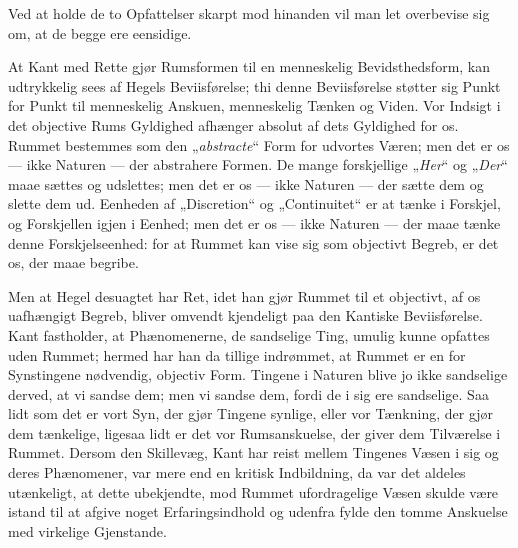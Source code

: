\documentclass[12pt,a4paper]{book}
\begin{document}
Ved at holde de to Opfattelser skarpt mod hinanden vil man let
overbevise sig om, at de begge ere eensidige.

At Kant med Rette gjør Rumsformen til en menneskelig
Bevidsthedsform, kan udtrykkelig sees af Hegels Beviisførelse; thi
denne Beviisførelse støtter sig Punkt for Punkt til menneskelig
Anskuen, menneskelig Tænken og Viden. Vor Indsigt i det objective Rums
Gyldighed afhænger absolut af dets Gyldighed for os. Rummet bestemmes
som den „\emph{abstracte}“ Form for udvortes Væren; men det er os ---
ikke Naturen --- der abstrahere Formen. De mange forskjellige
„\emph{Her}“ og „\emph{Der}“ maae sættes og udslettes; men det er os
--- ikke Naturen --- der sætte dem og slette dem ud. Eenheden af
„Discretion“ og „Continuitet“ er at tænke i Forskjel, og Forskjellen
igjen i Eenhed; men det er os --- ikke Naturen --- der maae tænke denne
Forskjelseenhed: for at Rummet kan vise sig som objectivt Begreb, er
det os, der maae begribe.

Men at Hegel desuagtet har Ret, idet han gjør Rummet til et objectivt,
af os uafhængigt Begreb, bliver omvendt kjendeligt paa den Kantiske
Beviisførelse. Kant fastholder,
at Phænomenerne, de sandselige Ting, umulig kunne opfattes uden
Rummet; hermed har han da tillige indrømmet, at Rummet er en for
Synstingene nødvendig, objectiv Form. Tingene i Naturen blive jo ikke
sandselige derved, at vi sandse dem; men vi sandse dem, fordi de i sig
ere sandselige. Saa lidt som det er vort Syn, der gjør Tingene synlige,
eller vor Tænkning, der gjør dem tænkelige, ligesaa lidt er det vor
Rumsanskuelse, der giver dem Tilværelse i Rummet. Dersom den
Skillevæg, Kant har reist mellem Tingenes Væsen i sig og deres
Phænomener, var mere end en kritisk Indbildning, da var det aldeles
utænkeligt, at dette ubekjendte, mod Rummet ufordragelige Væsen skulde
være istand til at afgive noget Erfaringsindhold og udenfra fylde den
tomme Anskuelse med virkelige Gjenstande.
\end{document}
